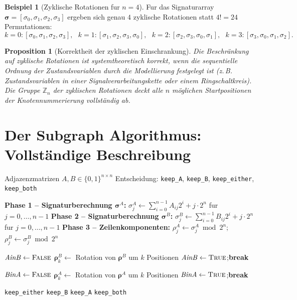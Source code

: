 ﻿\documentclass[12pt, a4paper, titlepage]{report}
\newtheorem{proposition}[theorem]{Proposition}
\theoremstyle{definition}
\newtheorem{example}[theorem]{Beispiel}
\theoremstyle{remark}
\begin{document}
\begin{example}[Zyklische Rotationen fur $n=4$]
Fur das Signaturarray $\bm{\sigma} = [\sigma_0, \sigma_1, \sigma_2, \sigma_3]$
ergeben sich genau $4$ zyklische Rotationen statt $4! = 24$ Permutationen:
\[
  k=0: [\sigma_0,\sigma_1,\sigma_2,\sigma_3], \text{ }
  k=1: [\sigma_1,\sigma_2,\sigma_3,\sigma_0], \text{ }
  k=2: [\sigma_2,\sigma_3,\sigma_0,\sigma_1], \text{ }
  k=3: [\sigma_3,\sigma_0,\sigma_1,\sigma_2].
\]
\end{example}

\begin{proposition}[Korrektheit der zyklischen Einschrankung]
\label{satz:zyklkorrekt}
Die Beschränkung auf zyklische Rotationen ist systemtheoretisch korrekt, wenn die
sequentielle Ordnung der Zustandsvariablen durch die Modellierung festgelegt ist
(z.\,B. Zustandsvariablen in einer Signalverarbeitungskette oder einem Ringschaltkreis).
Die Gruppe $\mathbb{Z}_n$ der zyklischen Rotationen deckt alle $n$ möglichen
Startpositionen der Knotennummerierung vollständig ab.
\end{proposition}

\section{Der Subgraph Algorithmus: Vollständige Beschreibung}

\begin{algorithm}[H]
\caption{Subgraph Algorithmus~\citep{epp2026subgraph}}
\label{alg:subgraph}
\begin{algorithmic}[1]
\Require Adjazenzmatrizen $A, B \in \{0,1\}^{n \times n}$
\Ensure Entscheidung: \texttt{keep\_A}, \texttt{keep\_B}, \texttt{keep\_either}, \texttt{keep\_both}

\State \textbf{Phase 1 -- Signaturberechnung $\bm{\sigma}^A$:}
  $\sigma_j^A \gets \sum_{i=0}^{n-1} A_{ij} 2^i + j \cdot 2^n$ fur $j=0,\ldots,n{-}1$
\State \textbf{Phase 2 -- Signaturberechnung $\bm{\sigma}^B$:}
  $\sigma_j^B \gets \sum_{i=0}^{n-1} B_{ij} 2^i + j \cdot 2^n$ fur $j=0,\ldots,n{-}1$
\State \textbf{Phase 3 -- Zeilenkomponenten:}
  $\rho_j^A \gets \sigma_j^A \bmod 2^n$;\quad $\rho_j^B \gets \sigma_j^B \bmod 2^n$

\State $\mathit{AinB} \gets \textsc{False}$
  \State $\bm{\rho}^B_k \gets$ Rotation von $\bm{\rho}^B$ um $k$ Positionen
    \State $\mathit{AinB} \gets \textsc{True}$;\quad \textbf{break}
  \EndIf
\EndFor

\State $\mathit{BinA} \gets \textsc{False}$
  \State $\bm{\rho}^A_k \gets$ Rotation von $\bm{\rho}^A$ um $k$ Positionen
    \State $\mathit{BinA} \gets \textsc{True}$;\quad \textbf{break}
  \EndIf
\EndFor

 \Return \texttt{keep\_either}
 \Return \texttt{keep\_B}
 \Return \texttt{keep\_A}
\Else{} \Return \texttt{keep\_both}
\EndIf
\end{algorithmic}
\end{algorithm}
\end{document}
